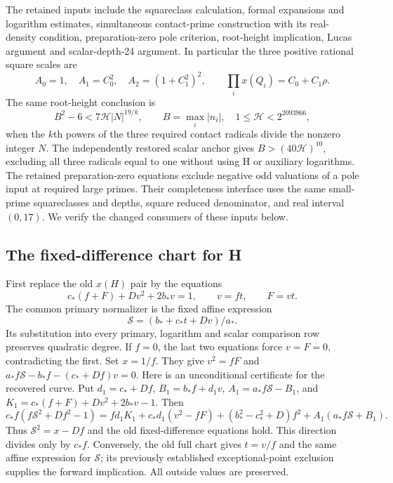 The retained inputs include the squareclass calculation, formal
expansions and logarithm estimates, simultaneous contact-prime
construction with its real-density condition, preparation-zero pole
criterion, root-height implication, Lucas argument and scalar-depth-24
argument. In particular the three positive rational square scales are
\[
 A_0=1,\quad A_1=C_0^2,\quad A_2=(1+C_1^2)^2,\qquad
 \prod_i x(Q_i)=C_0+C_1\rho .
\]
The same root-height conclusion is
\[
 B^2-6<7\mathcal H|N|^{19/k},\qquad
 B=\max_i|n_i|,\quad 1\leq\mathcal H<2^{2093966},
\]
when the $k$th powers of the three required contact radicals divide
the nonzero integer $N$. The independently restored scalar anchor
gives $B>(40\mathcal H)^{10}$, excluding all three radicals equal
to one without using H or auxiliary logarithms.
The retained preparation-zero equations exclude negative odd
valuations of a pole input at required large primes. Their
completeness interface uses the same small-prime squareclasses and
depths, square reduced denominator, and real interval $(0,17)$.
We verify the changed consumers of these inputs below.

\subsection{The fixed-difference chart for H}\label{subsec:v14-H}
First replace the old $x(H)$ pair by the equations
\begin{equation}\label{eq:v14-H-raw}
 c_*(f+F)+Dv^2+2b_*v=1,\qquad v=ft,\qquad F=vt.
\end{equation}
The common primary normalizer is the fixed affine expression
\begin{equation}\label{eq:v14-normalizer}
 \mathcal S=(b_*+c_*t+Dv)/a_*.
\end{equation}
Its substitution into every primary, logarithm and scalar comparison
row preserves quadratic degree. If $f=0$, the last two equations
force $v=F=0$, contradicting the first. Set $x=1/f$. They give
$v^2=fF$ and $a_*f\mathcal S-b_*f-(c_*+Df)v=0$.
Here is an unconditional certificate for the recovered curve.
Put $d_1=c_*+Df$, $B_1=b_*f+d_1v$,
$A_1=a_*f\mathcal S-B_1$, and
$K_1=c_*(f+F)+Dv^2+2b_*v-1$. Then
\[
 c_*f(f\mathcal S^2+Df^2-1)
 =fd_1K_1+c_*d_1(v^2-fF)
 +(b_*^2-c_*^2+D)f^2+A_1(a_*f\mathcal S+B_1).
\]
Thus $\mathcal S^2=x-Df$ and the old fixed-difference equations
hold. This direction divides only by $c_*f$. Conversely, the old
full chart gives $t=v/f$ and the same affine expression for
$\mathcal S$; its previously established exceptional-point exclusion
supplies the forward implication. All outside values are preserved.

